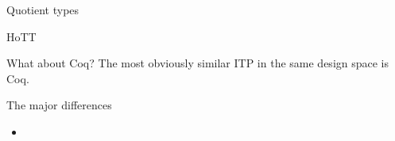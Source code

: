 \documentclass{beamer}
\begin{document}
\begin{frame}[fragile]{Quotient types}
\end{frame}

\begin{frame}[fragile]{HoTT}
\end{frame}

\begin{frame}[fragile]{What about Coq?}
  The most obviously similar ITP in the same design space is Coq.
  \begin{block}{The major differences}
    \begin{itemize}
    \item 
    \end{itemize}
  \end{block}
 
\end{frame}



\end{document}
